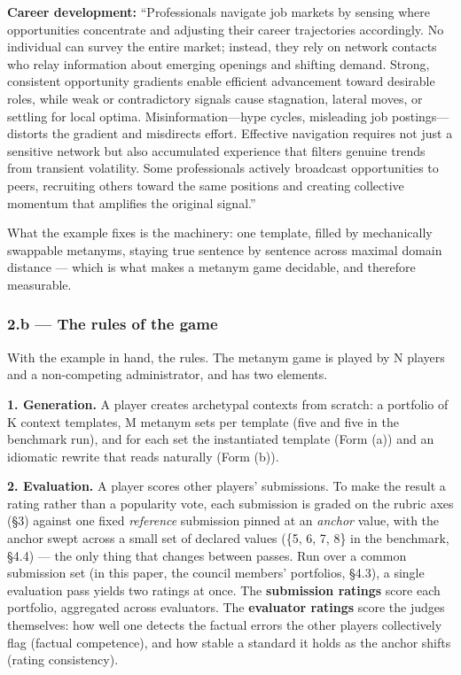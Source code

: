 \textbf{Career development:} ``Professionals navigate job markets by sensing where opportunities concentrate and adjusting their career trajectories accordingly. No individual can survey the entire market; instead, they rely on network contacts who relay information about emerging openings and shifting demand. Strong, consistent opportunity gradients enable efficient advancement toward desirable roles, while weak or contradictory signals cause stagnation, lateral moves, or settling for local optima. Misinformation---hype cycles, misleading job postings---distorts the gradient and misdirects effort. Effective navigation requires not just a sensitive network but also accumulated experience that filters genuine trends from transient volatility. Some professionals actively broadcast opportunities to peers, recruiting others toward the same positions and creating collective momentum that amplifies the original signal.''

What the example fixes is the machinery: one template, filled by mechanically swappable metanyms, staying true sentence by sentence across maximal domain distance --- which is what makes a metanym game decidable, and therefore measurable.

\subsubsection{2.b --- The rules of the game}\label{b-the-rules-of-the-game}

With the example in hand, the rules. The metanym game is played by N players and a non-competing administrator, and has two elements.

\textbf{1. Generation.} A player creates archetypal contexts from scratch: a portfolio of K context templates, M metanym sets per template (five and five in the benchmark run), and for each set the instantiated template (Form (a)) and an idiomatic rewrite that reads naturally (Form (b)).

\textbf{2. Evaluation.} A player scores other players' submissions. To make the result a rating rather than a popularity vote, each submission is graded on the rubric axes (§3) against one fixed \emph{reference} submission pinned at an \emph{anchor} value, with the anchor swept across a small set of declared values (\{5, 6, 7, 8\} in the benchmark, §4.4) --- the only thing that changes between passes. Run over a common submission set (in this paper, the council members' portfolios, §4.3), a single evaluation pass yields two ratings at once. The \textbf{submission ratings} score each portfolio, aggregated across evaluators. The \textbf{evaluator ratings} score the judges themselves: how well one detects the factual errors the other players collectively flag (factual competence), and how stable a standard it holds as the anchor shifts (rating consistency).

